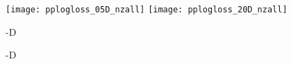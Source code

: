 \documentclass{sig-alternate}
\newcommand{\bbobdatapath}{ppdata/} %
\newcommand{\ERT}{\ensuremath{\mathrm{ERT}}}
\begin{document}
\begin{figure}
\centering
\texttt{[image: pplogloss\_05D\_nzall]}%
\texttt{[image: pplogloss\_20D\_nzall]}
\\[-6.2ex]
\parbox{0.49\columnwidth}{-D}%
\parbox{0.49\columnwidth}{-D}\\[5ex]
%
\\

\caption{\label{tab:ERTloss}%
\bbobloglosstablecaption{}
}
\end{figure}
\end{document}
